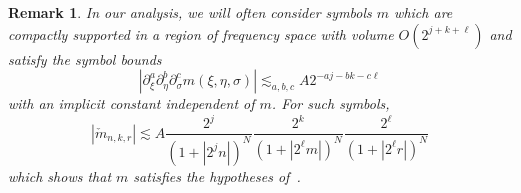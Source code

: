 \documentclass[letterpaper, reqno,final]{amsart}
\newtheorem{rmk}{Remark}
\begin{document}
\begin{rmk}\label{rmk:freq-loc-symbol-bds}
    In our analysis, we will often consider symbols $m$ which are compactly supported in a region of frequency space with volume $O(2^{j + k + \ell})$ and satisfy the symbol bounds
    \begin{equation*}
        |\partial_\xi^a \partial_\eta^b \partial_\sigma^c m(\xi,\eta,\sigma)| \lesssim_{a,b,c} A 2^{-aj - bk - c\ell}
    \end{equation*}
    with an implicit constant independent of $m$.  For such symbols,
    \begin{equation}\label{eqn:m-check-decay-bds}
        \left|\check{m}_{n,k,r}\right| \lesssim A \frac{2^j}{(1 + |2^{j}n|)^N}\frac{2^{k}}{(1 + |2^{\ell}m|)^N}\frac{2^{\ell}}{(1 + |2^{\ell}r|)^N}
    \end{equation}
    which shows that $m$ satisfies the hypotheses of~.
\end{rmk}
\end{document}
